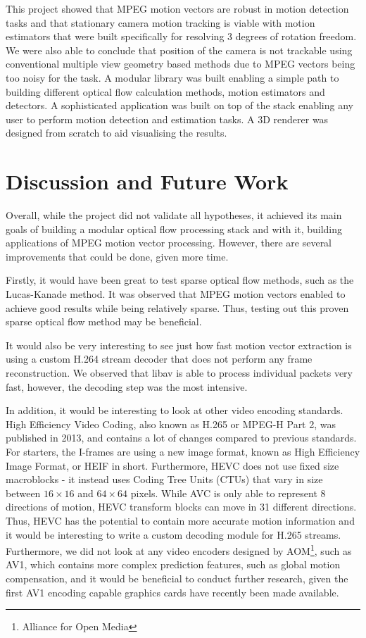 \documentclass[11pt,english]{report}
\begin{document}
This project showed that MPEG motion vectors are robust in motion detection tasks and that stationary camera motion tracking is viable with motion estimators that were built specifically for resolving 3 degrees of rotation freedom. We were also able to conclude that position of the camera is not trackable using conventional multiple view geometry based methods due to MPEG vectors being too noisy for the task. A modular library was built enabling a simple path to building different optical flow calculation methods, motion estimators and detectors. A sophisticated application was built on top of the stack enabling any user to perform motion detection and estimation tasks. A 3D renderer was designed from scratch to aid visualising the results.

\section{Discussion and Future Work}

Overall, while the project did not validate all hypotheses, it achieved its main goals of building a modular optical flow processing stack and with it, building applications of MPEG motion vector processing. However, there are several improvements that could be done, given more time.

Firstly, it would have been great to test sparse optical flow methods, such as the Lucas-Kanade method\cite{lucas-kanade}. It was observed that MPEG motion vectors enabled to achieve good results while being relatively sparse. Thus, testing out this proven sparse optical flow method may be beneficial.

It would also be very interesting to see just how fast motion vector extraction is using a custom H.264 stream decoder that does not perform any frame reconstruction. We observed that libav is able to process individual packets very fast, however, the decoding step was the most intensive.

In addition, it would be interesting to look at other video encoding standards. High Efficiency Video Coding, also known as H.265 or MPEG-H Part 2, was published in 2013, and contains a lot of changes compared to previous standards. For starters, the I-frames are using a new image format, known as High Efficiency Image Format, or HEIF in short. Furthermore, HEVC does not use fixed size macroblocks - it instead uses Coding Tree Units (CTUs) that vary in size between $16 \times 16$ and $64 \times 64$ pixels\cite{h265}. While AVC is only able to represent 8 directions of motion, HEVC transform blocks can move in 31 different directions. Thus, HEVC has the potential to contain more accurate motion information and it would be interesting to write a custom decoding module for H.265 streams. Furthermore, we did not look at any video encoders designed by AOM\footnote{Alliance for Open Media}, such as AV1, which contains more complex prediction features, such as global motion compensation\cite{av1}\cite{av1_global_motion}, and it would be beneficial to conduct further research, given the first AV1 encoding capable graphics cards have recently been made available.
\end{document}
